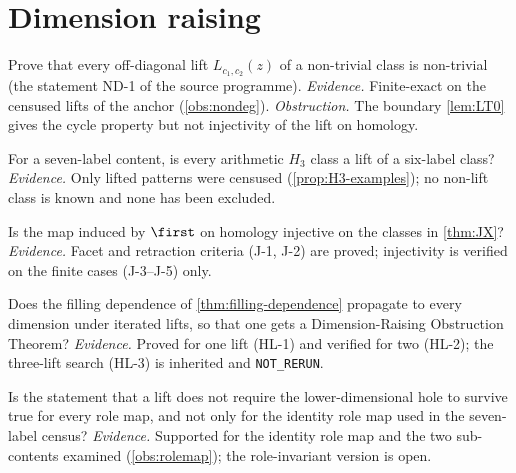 \section{Dimension raising}
\begin{problem}\label{prob:nondeg}
Prove that every off-diagonal lift $L_{c_1,c_2}(z)$ of a non-trivial class is non-trivial (the statement ND-1 of the source programme). \emph{Evidence.} Finite-exact on the censused lifts of the anchor (\cref{obs:nondeg}). \emph{Obstruction.} The boundary \cref{lem:LT0} gives the cycle property but not injectivity of the lift on homology.
\end{problem}
\begin{problem}\label{prob:every-lift}
For a seven-label content, is every arithmetic $H_3$ class a lift of a six-label class? \emph{Evidence.} Only lifted patterns were censused (\cref{prop:H3-examples}); no non-lift class is known and none has been excluded.
\end{problem}
\begin{problem}\label{prob:Jinjective}
Is the map induced by $\first$ on homology injective on the classes in \cref{thm:JX}? \emph{Evidence.} Facet and retraction criteria (J-1, J-2) are proved; injectivity is verified on the finite cases (J-3--J-5) only.
\end{problem}
\begin{problem}\label{prob:propagation}
Does the filling dependence of \cref{thm:filling-dependence} propagate to every dimension under iterated lifts, so that one gets a Dimension-Raising Obstruction Theorem? \emph{Evidence.} Proved for one lift (HL-1) and verified for two (HL-2); the three-lift search (HL-3) is inherited and \texttt{NOT\_RERUN}.
\end{problem}
\begin{problem}\label{prob:rolemap}
Is the statement that a lift does not require the lower-dimensional hole to survive true for every role map, and not only for the identity role map used in the seven-label census? \emph{Evidence.} Supported for the identity role map and the two sub-contents examined (\cref{obs:rolemap}); the role-invariant version is open.
\end{problem}

